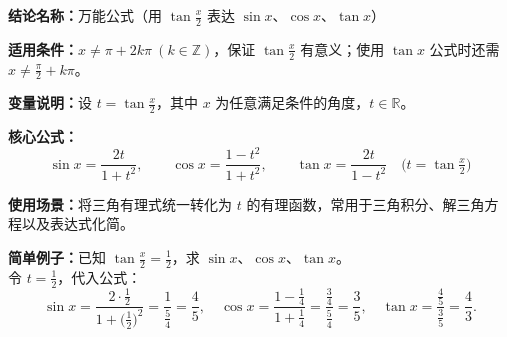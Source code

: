 \textbf{结论名称：}万能公式（用 $\tan\frac{x}{2}$ 表达 $\sin x$、$\cos x$、$\tan x$）

\textbf{适用条件：}$x \neq \pi + 2k\pi\ (k\in\mathbb{Z})$，保证 $\tan\frac{x}{2}$ 有意义；使用 $\tan x$ 公式时还需 $x\neq \frac{\pi}{2}+k\pi$。

\textbf{变量说明：}设 $t = \tan\frac{x}{2}$，其中 $x$ 为任意满足条件的角度，$t \in \mathbb{R}$。

\textbf{核心公式：}
\[
\boxed{\sin x = \frac{2t}{1+t^2},\qquad \cos x = \frac{1-t^2}{1+t^2},\qquad \tan x = \frac{2t}{1-t^2}}\quad \bigl(t=\tan\tfrac{x}{2}\bigr)
\]

\textbf{使用场景：}将三角有理式统一转化为 $t$ 的有理函数，常用于三角积分、解三角方程以及表达式化简。

\textbf{简单例子：}已知 $\tan\frac{x}{2}=\frac12$，求 $\sin x$、$\cos x$、$\tan x$。\\
令 $t=\frac12$，代入公式：
\[
\sin x = \frac{2\cdot\frac12}{1+\bigl(\frac12\bigr)^2} = \frac{1}{\frac54} = \frac45,\quad
\cos x = \frac{1-\frac14}{1+\frac14} = \frac{\frac34}{\frac54} = \frac35,\quad
\tan x = \frac{\frac45}{\frac35} = \frac43.
\]